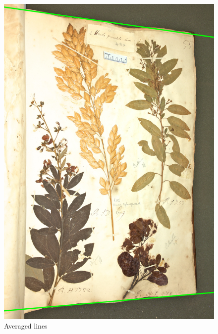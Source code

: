 \documentclass[runningheads,a4paper]{llncs}
\begin{document}
\begin{figure}[htbm]
  \includegraphics[width=\textwidth]{figures/Catesby_HS232_056_0602-hough-averaged.jpg}
  \caption{Averaged lines}\label{fig:averaged}
\end{figure}
\end{document}
